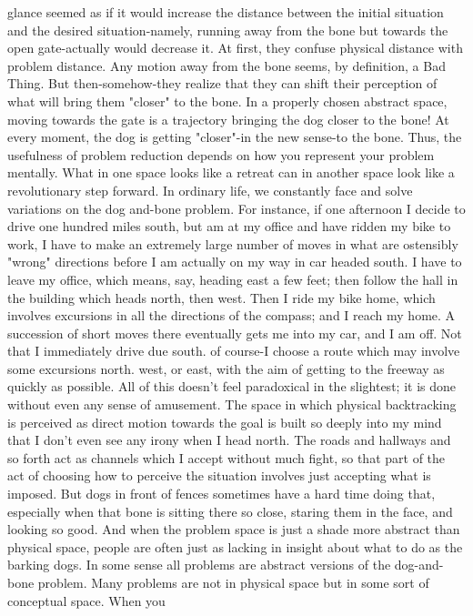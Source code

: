 {glance seemed as if it would increase the distance between the initial situation and the
desired situation-namely, running away from the bone but towards the open gate-actually
would decrease it. At first, they confuse physical distance with problem distance. Any
motion away from the bone seems, by definition, a Bad Thing. But then-somehow-they
realize that they can shift their perception of what will bring them "closer" to the bone. In
a properly chosen abstract space, moving towards the gate is a trajectory bringing the dog
closer to the bone! At every moment, the dog is getting "closer"-in the new sense-to the
bone. Thus, the usefulness of problem reduction depends on how you represent your
problem mentally. What in one space looks like a retreat can in another space look like a
revolutionary step forward.
        In ordinary life, we constantly face and solve variations on the dog and-bone
problem. For instance, if one afternoon I decide to drive one hundred miles south, but am
at my office and have ridden my bike to work, I have to make an extremely large number
of moves in what are ostensibly "wrong" directions before I am actually on my way in car
headed south. I have to leave my office, which means, say, heading east a few feet; then
follow the hall in the building which heads north, then west. Then I ride my bike home,
which involves excursions in all the directions of the compass; and I reach my home. A
succession of short moves there eventually gets me into my car, and I am off. Not that I
immediately drive due south. of course-I choose a route which may involve some
excursions north. west, or east, with the aim of getting to the freeway as quickly as
possible.
        All of this doesn't feel paradoxical in the slightest; it is done without even any
sense of amusement. The space in which physical backtracking is perceived as direct
motion towards the goal is built so deeply into my mind that I don't even see any irony
when I head north. The roads and hallways and so forth act as channels which I accept
without much fight, so that part of the act of choosing how to perceive the situation
involves just accepting what is imposed. But dogs in front of fences sometimes have a
hard time doing that, especially when that bone is sitting there so close, staring them in
the face, and looking so good. And when the problem space is just a shade more abstract
than physical space, people are often just as lacking in insight about what to do as the
barking dogs.
        In some sense all problems are abstract versions of the dog-and-bone problem.
Many problems are not in physical space but in some sort of conceptual space. When you
}
